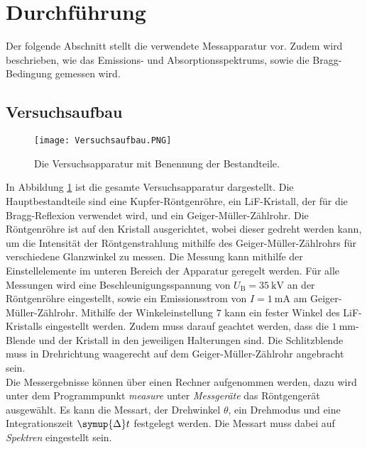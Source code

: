 \section{Durchführung}

    Der folgende Abschnitt stellt die verwendete Messapparatur vor.
    Zudem wird beschrieben,
    wie das Emissions- und Absorptionsspektrums,
    sowie die Bragg-Bedingung gemessen wird.

\subsection{Versuchsaufbau}

    \begin{figure}
        \centering
        \caption{Die Versuchsapparatur mit Benennung der Bestandteile.}
        \texttt{[image: Versuchsaufbau.PNG]}
        \label{fig:Versuchsapparatur}
    \end{figure}

    In Abbildung \ref{fig:Versuchsapparatur} ist die gesamte Versuchsapparatur dargestellt.
    Die Hauptbestandteile sind eine Kupfer-Röntgenröhre, 
    ein LiF-Kristall,
    der für die Bragg-Reflexion verwendet wird,
    und ein Geiger-Müller-Zählrohr.
    Die Röntgenröhre ist auf den Kristall ausgerichtet,
    wobei dieser gedreht werden kann,
    um die Intensität der Röntgenstrahlung mithilfe des Geiger-Müller-Zählrohrs für verschiedene Glanzwinkel zu messen.
    Die Messung kann mithilfe der Einstellelemente im unteren Bereich der Apparatur geregelt werden.
    Für alle Messungen wird eine Beschleunigungsspannung von $U_\text{B} = \SI{35}{\kilo\volt}$ an der Röntgenröhre eingestellt,
    sowie ein Emissionsstrom von $I = \SI{1}{\milli\ampere}$ am Geiger-Müller-Zählrohr.
    Mithilfe der Winkeleinstellung $7$ kann ein fester Winkel des LiF-Kristalls eingestellt werden.
    Zudem muss darauf geachtet werden,
    dass die $\SI{1}{\milli\meter}$-Blende und der Kristall in den jeweiligen Halterungen sind.
    Die Schlitzblende muss in Drehrichtung waagerecht auf dem Geiger-Müller-Zählrohr angebracht sein.
    \\
    Die Messergebnisse können über einen Rechner aufgenommen werden,
    dazu wird unter dem Programmpunkt \textit{measure} unter \textit{Messgeräte} das Röntgengerät ausgewählt.
    Es kann die Messart, der Drehwinkel $\theta$, ein Drehmodus und eine Integrationszeit $\symup{\Delta}t$ festgelegt werden.
    Die Messart muss dabei auf \textit{Spektren} eingestellt sein.

